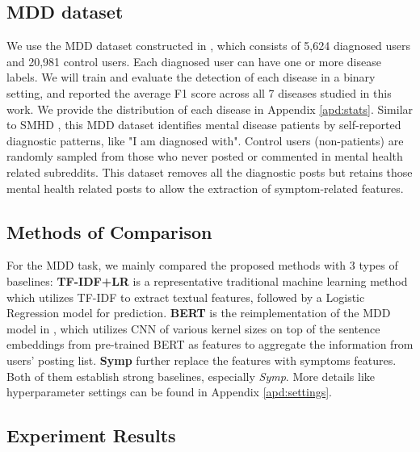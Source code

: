 \subsection{MDD dataset}
\label{sec:mdd_dataset}
We use the MDD dataset constructed in \citet{Zhang2022SymptomIF}, which consists of 5,624 diagnosed users and 20,981 control users. Each diagnosed user can have one or more disease labels. We will train and evaluate the detection of each disease in a binary setting, and reported the average F1 score across all 7 diseases studied in this work. We provide the distribution of each disease in Appendix \ref{apd:stats}.
Similar to SMHD \cite{cohan2018smhd}, this MDD dataset identifies mental disease patients by self-reported diagnostic patterns, like "I am diagnosed with".
Control users (non-patients) are randomly sampled from those who never posted or commented in mental health related subreddits. This dataset removes all the diagnostic posts but retains those mental health related posts to allow the extraction of symptom-related features. 

\subsection{Methods of Comparison}

For the MDD task, we mainly compared the proposed methods with 3 types of baselines: \textbf{TF-IDF+LR} is a representative traditional machine learning method which utilizes TF-IDF to extract textual features, followed by a Logistic Regression model for prediction. \textbf{BERT} is the reimplementation of the MDD model in \citet{nguyen2022improving}, which utilizes CNN of various kernel sizes on top of the sentence embeddings from pre-trained BERT as features to aggregate the information from users' posting list. \textbf{Symp} \cite{Zhang2022SymptomIF} further replace the features with symptoms features. Both of them establish strong baselines, especially \textit{Symp}. More details like hyperparameter settings can be found in Appendix \ref{apd:settings}.

\subsection{Experiment Results}

